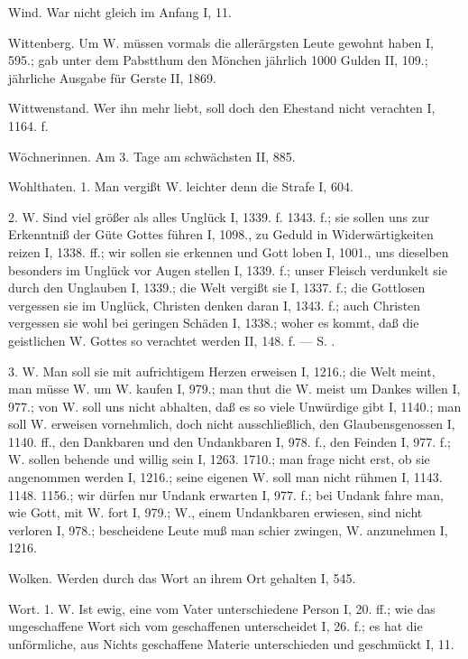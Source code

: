 Wind. War nicht gleich im Anfang I, 11.

Wittenberg. Um W. müssen vormals die allerärgsten Leute gewohnt haben I, 595.; gab unter dem Pabstthum den Mönchen jährlich 1000 Gulden II, 109.; jährliche Ausgabe für Gerste II, 1869.

Wittwenstand. Wer ihn mehr liebt, soll doch den Ehestand nicht verachten I, 1164. f.

Wöchnerinnen. Am 3. Tage am schwächsten II, 885.

Wohlthaten. 1.  Man vergißt W. leichter denn die Strafe I, 604.

2. W.  Sind viel größer als alles Unglück I, 1339. f. 1343. f.; sie sollen uns zur Erkenntniß der Güte Gottes führen I, 1098., zu Geduld in Widerwärtigkeiten reizen I, 1338. ff.; wir sollen sie erkennen und Gott loben I, 1001., uns dieselben besonders im Unglück vor Augen stellen I, 1339. f.; unser Fleisch verdunkelt sie durch den Unglauben I, 1339.; die Welt vergißt sie I, 1337. f.; die Gottlosen vergessen sie im Unglück, Christen denken daran I, 1343. f.; auch Christen vergessen sie wohl bei geringen Schäden I, 1338.; woher es kommt, daß die geistlichen W. Gottes so verachtet werden II, 148. f. — S. .

3. W.  Man soll sie mit aufrichtigem Herzen erweisen I, 1216.; die Welt meint, man müsse W. um W. kaufen I, 979.; man thut die W. meist um Dankes willen I, 977.; von W. soll uns nicht abhalten, daß es so viele Unwürdige gibt I, 1140.; man soll W. erweisen vornehmlich, doch nicht ausschließlich, den Glaubensgenossen I, 1140. ff., den Dankbaren und den Undankbaren I, 978. f., den Feinden I, 977. f.; W. sollen behende und willig sein I, 1263. 1710.; man frage nicht
erst, ob sie angenommen werden I, 1216.; seine eigenen W. soll man nicht rühmen I, 1143. 1148. 1156.; wir dürfen nur Undank erwarten I, 977. f.; bei Undank fahre man, wie Gott, mit W. fort I, 979.; W., einem Undankbaren erwiesen, sind nicht verloren I, 978.; bescheidene Leute muß man schier zwingen, W. anzunehmen I, 1216.

Wolken. Werden durch das Wort an ihrem Ort gehalten I, 545.

Wort. 1.  W. Ist ewig, eine vom Vater unterschiedene Person I, 20. ff.; wie das ungeschaffene Wort sich vom geschaffenen unterscheidet I, 26. f.; es hat die unförmliche, aus Nichts geschaffene Materie unterschieden und geschmückt I, 11.

